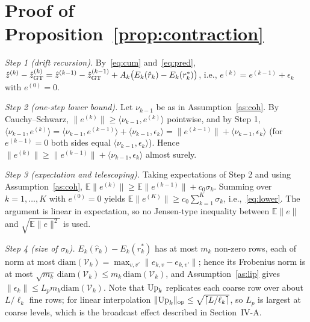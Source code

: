 \section{Proof of Proposition~\ref{prop:contraction}}
\label{app:p1}
\textit{Step 1 (drift recursion).} By~\eqref{eq:cum} and~\eqref{eq:pred}, $\hat{z}^{(k)}-\hat{z}^{(k)}_{\mathrm{GT}}=\hat{z}^{(k-1)}-\hat{z}^{(k-1)}_{\mathrm{GT}}+A_k\big(E_k(\hat r_k)-E_k(r_k^\ast)\big)$, i.e., $e^{(k)}=e^{(k-1)}+\epsilon_k$ with $e^{(0)}=0$.

\textit{Step 2 (one-step lower bound).} Let $\nu_{k-1}$ be as in Assumption~\ref{as:coh}. By Cauchy--Schwarz, $\|e^{(k)}\|\ge\langle \nu_{k-1},e^{(k)}\rangle$ pointwise, and by Step 1, $\langle \nu_{k-1},e^{(k)}\rangle=\langle \nu_{k-1},e^{(k-1)}\rangle+\langle \nu_{k-1},\epsilon_k\rangle=\|e^{(k-1)}\|+\langle \nu_{k-1},\epsilon_k\rangle$ (for $e^{(k-1)}=0$ both sides equal $\langle \nu_{k-1},\epsilon_k\rangle$). Hence $\|e^{(k)}\|\ge\|e^{(k-1)}\|+\langle \nu_{k-1},\epsilon_k\rangle$ almost surely.

\textit{Step 3 (expectation and telescoping).} Taking expectations of Step 2 and using Assumption~\ref{as:coh}, $\mathbb{E}\|e^{(k)}\|\ge\mathbb{E}\|e^{(k-1)}\|+c_0\sigma_k$. Summing over $k=1,\dots,K$ with $e^{(0)}=0$ yields $\mathbb{E}\|e^{(K)}\|\ge c_0\sum_{k=1}^K\sigma_k$, i.e.,~\eqref{eq:lower}. The argument is linear in expectation, so no Jensen-type inequality between $\mathbb{E}\|e\|$ and $\sqrt{\mathbb{E}\|e\|^2}$ is used.

\textit{Step 4 (size of $\sigma_k$).} $E_k(\hat r_k)-E_k(r_k^\ast)$ has at most $m_k$ non-zero rows, each of norm at most $\mathrm{diam}(\mathcal{V}_k)=\max_{v,v'}\|e_{k,v}-e_{k,v'}\|$; hence its Frobenius norm is at most $\sqrt{m_k}\,\mathrm{diam}(\mathcal{V}_k)\le m_k\,\mathrm{diam}(\mathcal{V}_k)$, and Assumption~\ref{as:lip} gives $\|\epsilon_k\|\le L_p m_k\mathrm{diam}(\mathcal{V}_k)$. Note that $\mathrm{Up}_k$ replicates each coarse row over about $L/\ell_k$ fine rows; for linear interpolation $\|\mathrm{Up}_k\|_{\mathrm{op}}\le\sqrt{\lceil L/\ell_k\rceil}$, so $L_p$ is largest at coarse levels, which is the broadcast effect described in Section~IV-A.

